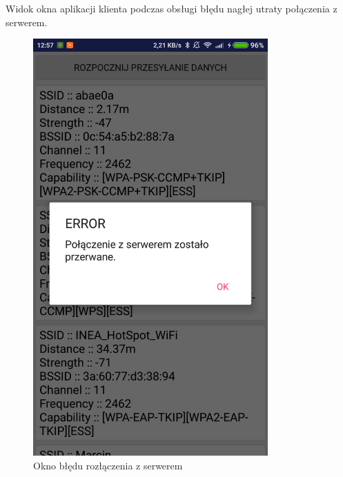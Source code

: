 \documentclass{article}
\begin{document}
\newpage
Widok okna aplikacji klienta podczas obsługi błędu nagłej utraty połączenia z serwerem.
\begin{figure}[H]
	\centering
	\includegraphics[width=9cm]{apkError.png}
	\caption{Okno błędu rozłączenia z serwerem}
	\label{fig:rysowani.jpg}
\end{figure}
\end{document}
